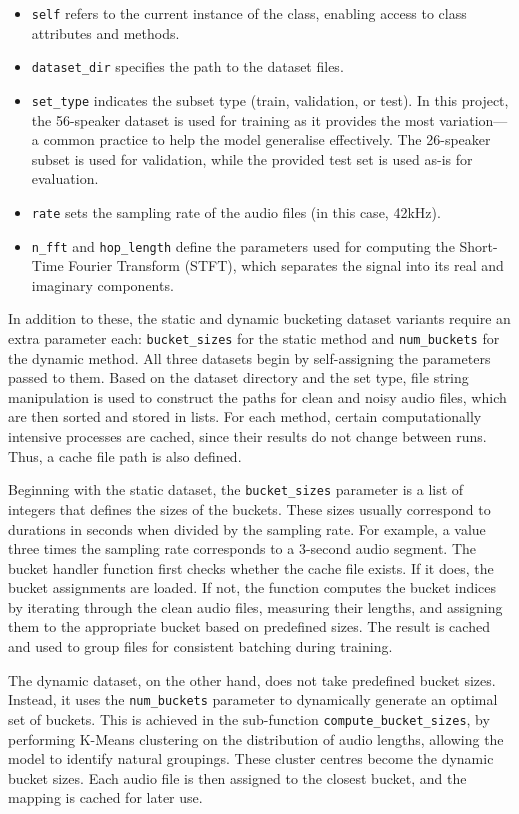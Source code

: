 \begin{itemize}
\item \texttt{self} refers to the current instance of the class, enabling access to class attributes and methods.
\item \texttt{dataset\_dir} specifies the path to the dataset files.
\item \texttt{set\_type} indicates the subset type (train, validation, or test). In this project, the 56-speaker dataset is used for training as it provides the most variation—a common practice to help the model generalise effectively. The 26-speaker subset is used for validation, while the provided test set is used as-is for evaluation.
\item \texttt{rate} sets the sampling rate of the audio files (in this case, 42kHz).
\item \texttt{n\_fft} and \texttt{hop\_length} define the parameters used for computing the Short-Time Fourier Transform (STFT), which separates the signal into its real and imaginary components.
\end{itemize}

In addition to these, the static and dynamic bucketing dataset variants require an extra parameter each: \texttt{bucket\_sizes} for the static method and \texttt{num\_buckets} for the dynamic method. All three datasets begin by self-assigning the parameters passed to them. Based on the dataset directory and the set type, file string manipulation is used to construct the paths for clean and noisy audio files, which are then sorted and stored in lists. For each method, certain computationally intensive processes are cached, since their results do not change between runs. Thus, a cache file path is also defined.

Beginning with the static dataset, the \texttt{bucket\_sizes} parameter is a list of integers that defines the sizes of the buckets. These sizes usually correspond to durations in seconds when divided by the sampling rate. For example, a value three times the sampling rate corresponds to a 3-second audio segment. The bucket handler function first checks whether the cache file exists. If it does, the bucket assignments are loaded. If not, the function computes the bucket indices by iterating through the clean audio files, measuring their lengths, and assigning them to the appropriate bucket based on predefined sizes. The result is cached and used to group files for consistent batching during training.

The dynamic dataset, on the other hand, does not take predefined bucket sizes. Instead, it uses the \texttt{num\_buckets} parameter to dynamically generate an optimal set of buckets. This is achieved in the sub-function \texttt{compute\_bucket\_sizes}, by performing K-Means clustering on the distribution of audio lengths, allowing the model to identify natural groupings. These cluster centres become the dynamic bucket sizes. Each audio file is then assigned to the closest bucket, and the mapping is cached for later use.

